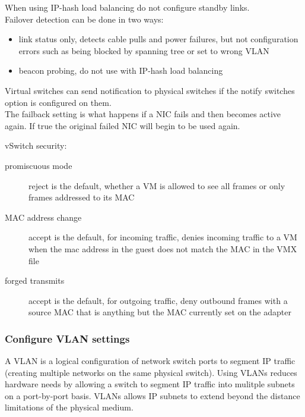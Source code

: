 When using IP-hash load balancing do not configure standby links.\\

Failover detection can be done in two ways:

\begin{itemize}

\item link status only, detects cable pulls and power failures, but not
configuration errors such as being blocked by spanning tree or set to wrong
VLAN

\item beacon probing, do not use with IP-hash load balancing

\end{itemize}

Virtual switches can send notification to physical switches if the notify
switches option is configured on them.\\

The failback setting is what happens if a NIC fails and then becomes active
again. If true the original failed NIC will begin to be used again.

vSwitch security:

\begin{description}

\item[promiscuous mode]
reject is the default, whether a VM is allowed to see all frames or only
frames addressed to its MAC

\item[MAC address change]
accept is the default, for incoming traffic, denies incoming traffic to a VM
when the mac address in the guest does not match the MAC in the VMX file

\item[forged transmits]
accept is the default, for outgoing traffic, deny outbound frames with a
source MAC that is anything but the MAC currently set on the adapter

\end{description}

\subsubsection{Configure VLAN settings}

A VLAN is a logical configuration of network switch ports to segment IP
traffic (creating multiple networks on the same physical switch). Using VLANs
reduces hardware needs by allowing a switch to segment IP traffic into
mulitple subnets on a port-by-port basis. VLANs allows IP subnets to extend
beyond the distance limitations of the physical medium.\\

